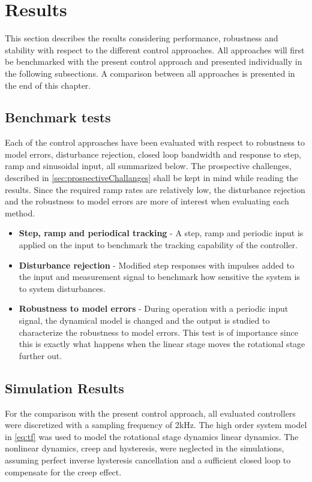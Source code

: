 \chapter{Results}\label{cha:result}
This section describes the results considering performance, robustness and stability with respect to the different control approaches. All approaches will first be benchmarked with the present control approach and presented individually in the following subsections. A comparison between all approaches is presented in the end of this chapter.

\section{Benchmark tests}
Each of the control approaches have been evaluated with respect to robustness to model errors, disturbance rejection, closed loop bandwidth and response to step, ramp and sinusoidal input, all summarized below. The prospective challenges, described in \ref{sec:prospectiveChallanges} shall be kept in mind while reading the results. Since the required ramp rates are relatively low, the disturbance rejection and the robustness to model errors are more of interest when evaluating each method.

\begin{itemize}
\item {\bf Step, ramp and periodical tracking} - A step, ramp and periodic input is applied on the input to benchmark the tracking capability of the controller.
\item {\bf Disturbance rejection} - Modified step responses with impulses added to the input and measurement signal to benchmark how sensitive the system is to system disturbances.
\item {\bf Robustness to model errors} - During operation with a periodic input signal, the dynamical model is changed and the output is studied to characterize the robustness to model errors. This test is of importance since this is exactly what happens when the linear stage moves the rotational stage further out.
\end{itemize}

\section{Simulation Results}
For the comparison with the present control approach, all evaluated controllers were discretized with a sampling frequency of 2kHz. The high order system model in \eqref{eq:tf} was used to model the rotational stage dynamics linear dynamics. The nonlinear dynamics, creep and hysteresis, were neglected in the simulations, assuming perfect inverse hysteresis cancellation and a sufficient closed loop to compensate for the creep effect.

